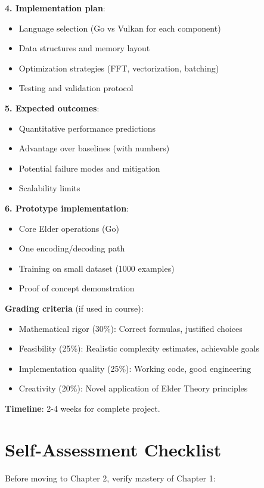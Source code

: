 \begin{challenge}
\textbf{4. Implementation plan}:
\begin{itemize}
\item Language selection (Go vs Vulkan for each component)
\item Data structures and memory layout
\item Optimization strategies (FFT, vectorization, batching)
\item Testing and validation protocol
\end{itemize}

\textbf{5. Expected outcomes}:
\begin{itemize}
\item Quantitative performance predictions
\item Advantage over baselines (with numbers)
\item Potential failure modes and mitigation
\item Scalability limits
\end{itemize}

\textbf{6. Prototype implementation}:
\begin{itemize}
\item Core Elder operations (Go)
\item One encoding/decoding path
\item Training on small dataset (1000 examples)
\item Proof of concept demonstration
\end{itemize}

\textbf{Grading criteria} (if used in course):
\begin{itemize}
\item Mathematical rigor (30\%): Correct formulas, justified choices
\item Feasibility (25\%): Realistic complexity estimates, achievable goals
\item Implementation quality (25\%): Working code, good engineering
\item Creativity (20\%): Novel application of Elder Theory principles
\end{itemize}

\textbf{Timeline}: 2-4 weeks for complete project.
\end{challenge}

\section{Self-Assessment Checklist}

Before moving to Chapter 2, verify mastery of Chapter 1:

